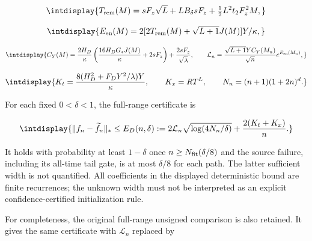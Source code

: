 \begingroup\renewcommand{\theHequation}{intdisplay.65}
\begin{equation*}
\intdisplay{
T_{\mathrm{rem}}(M)=sF_z\sqrt L+LB_\delta sF_z+\tfrac12L^2t_2F_z^2M,
}
\end{equation*}
\endgroup

\begingroup\renewcommand{\theHequation}{intdisplay.66}
\begin{equation*}
\intdisplay{
E_{\mathrm{en}}(M)=2[2T_{\mathrm{rem}}(M)+\sqrt{L+1}J(M)]Y/\kappa,
}
\end{equation*}
\endgroup

\begingroup\renewcommand{\theHequation}{intdisplay.67}
\begin{equation*}
\intdisplay{
C_Y(M)=\frac{2H_D}{\kappa}
\left(\frac{16H_DG_*J(M)}{\kappa}+2sF_z\right)
+\frac{2sF_z}{\sqrt\lambda},
\qquad
\mathcal L_n=\frac{\sqrt{L+1}YC_Y(M_n)}{\sqrt n}e^{E_{\mathrm{en}}(M_n)},
}
\end{equation*}
\endgroup

\begingroup\renewcommand{\theHequation}{intdisplay.68}
\begin{equation*}
\intdisplay{
K_t=\frac{8(H_D^2+F_DY^2/\lambda)Y}{\kappa},\qquad
K_x=RT^L,\qquad N_n=(n+1)(1+2n)^d.
}
\end{equation*}
\endgroup


For each fixed \(0<\delta<1\), the full-range certificate is


\begingroup\renewcommand{\theHequation}{intdisplay.69}
\begin{equation*}
\intdisplay{
\|f_n-\widetilde f_n\|_*
\le E_D(n,\delta):=
2\mathcal L_n\sqrt{\log(4N_n/\delta)}+
\frac{2(K_t+K_x)}n.
}
\end{equation*}
\endgroup


It holds with probability at least \(1-\delta\) once \(n\ge N_{\rm fit}(\delta/8)\) and the source failure, including its all-time tail gate, is at most \(\delta/8\) for each path. The latter sufficient width is not quantified. All coefficients in the displayed deterministic bound are finite recurrences; the unknown width must not be interpreted as an explicit confidence-certified initialization rule.



For completeness, the original full-range unsigned comparison is also retained. It gives the same certificate with \(\mathcal L_n\) replaced by


